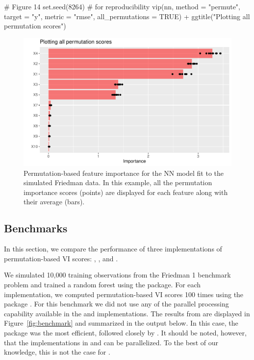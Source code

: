 \begin{example}
# Figure 14
set.seed(8264)  # for reproducibility
vip(nn, method = "permute", target = "y", metric = "rmse",
    all_permutations = TRUE) +
  ggtitle("Plotting all permutation scores")
\end{example}

\begin{figure}[!htb]
  \centering
  \includegraphics[width=1\linewidth]{figures/vip-permute-nn-all}
  \caption{Permutation-based feature importance for the NN model fit to the simulated Friedman data. In this example, all the permutation importance scores (points) are displayed for each feature along with their average (bars).}
  \label{fig:vip-permute-nn-all}
\end{figure}


\subsection{Benchmarks}

In this section, we compare the performance of three implementations of permutation-based VI scores: , , and .

We simulated 10,000 training observations from the Friedman 1 benchmark problem and trained a random forest using the  package. For each implementation, we computed permutation-based VI scores 100 times using the  package \citep{microbenchmark-pkg}. For this benchmark we did not use any of the parallel processing capability available in the  and  implementations. The results from  are displayed in Figure~\ref{fig:benchmark} and summarized in the output below. In this case, the  package was the most efficient, followed closely by . It should be noted, however, that the implementations in  and  can be parallelized. To the best of our knowledge, this is not the case for .

